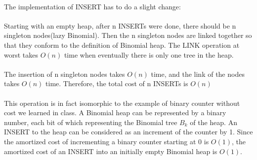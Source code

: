 \begin{problem}{2} ~\\
The implementation of INSERT has to do a slight change:\\
\\
Starting with an empty heap, after n INSERTs were done, there should be n singleton nodes(lazy Binomial). Then the n singleton nodes are linked together so that they conform to the definition of Binomial heap. The LINK operation at worst takes $O(n)$ time when eventually there is only one tree in the heap.\\
\\
The insertion of n singleton nodes takes $O(n)$ time, and the link of the nodes takes $O(n)$ time. Therefore, the total cost of n INSERTs is $O(n)$\\
\\
This operation is in fact isomorphic to the example of binary counter without cost we learned in class. A Binomial heap can be represented by a binary number, each bit of which representing the Binomial tree $B_k$ of the heap. An INSERT to the heap can be considered as an increment of the counter by 1. Since the amortized cost of incrementing a binary counter starting at 0 is $O(1)$, the amortized cost of an INSERT into an initially empty Binomial heap is $O(1)$. 
\end{problem}

